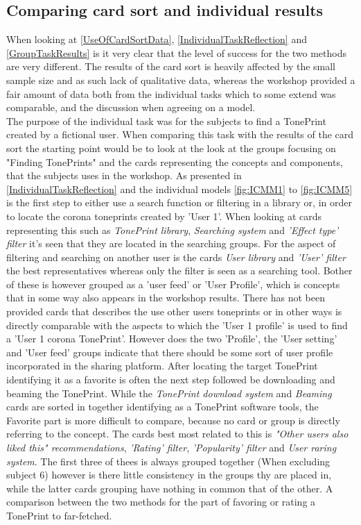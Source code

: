 \subsection*{Comparing card sort and individual results}
\label{ComparingIndividualAndCard}
When looking at \autoref{UseOfCardSortData}, \autoref{IndividualTaskReflection} and \autoref{GroupTaskResults} is it very clear that the level of success for the two methods are very different. The results of the card sort is heavily affected by the small sample size and as such lack of qualitative data, whereas the workshop provided a fair amount of data both from the individual tasks which to some extend was comparable, and the discussion when agreeing on a model.\\
The purpose of the individual task was for the subjects to find a TonePrint created by a fictional user. When comparing this task with the results of the card sort the starting point would be to look at the look at the groups focusing on "Finding TonePrints" and the cards representing the concepts and components, that the subjects uses in the workshop. As presented in
\autoref{IndividualTaskReflection} and the individual models \autoref{fig:ICMM1} to \autoref{fig:ICMM5} is the first step to either use a search function or filtering in a library or, in order to locate the corona toneprints created by 'User 1'. When looking at cards representing this such as \textit{TonePrint library}, \textit{Searching system} and \textit{'Effect type' filter} it's seen that they are located in the searching groups. For the aspect of filtering and searching on another user is the cards \textit{User library} and \textit{'User' filter} the best representatives whereas only the filter is seen as a searching tool. Bother of these is however grouped as a 'user feed' or 'User Profile', which is concepts that in some way also appears in the workshop results. There has not been provided cards that describes the use other users toneprints or in other ways is directly comparable with the aspects to which the 'User 1 profile' is used to find a 'User 1 corona TonePrint'. However does the two 'Profile', the 'User setting' and 'User feed' groups indicate that there should be some sort of user profile incorporated in the sharing platform. After locating the target TonePrint identifying it as a favorite is often the next step followed be downloading and beaming the TonePrint. While the \textit{TonePrint download system} and \textit{Beaming} cards are sorted in together identifying as a TonePrint software tools, the Favorite part is more difficult to compare, because no card or group is directly referring to the concept. The cards best most related to this is \textit{"Other users also liked this" recommendations}, \textit{'Rating' filter}, \textit{'Popularity' filter} and \textit{User raring system}. The first three of thees is always grouped together (When excluding subject 6) however is there little consistency in the groups thy are placed in, while the latter cards grouping have nothing in common that of the other. A comparison between the two methods for the part of favoring or rating a TonePrint to far-fetched.

